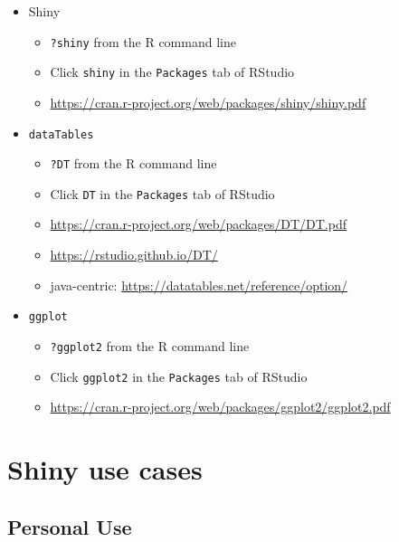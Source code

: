 \documentclass[10pt, letterpaper]{article}
\begin{document}
\begin{spacing}{1.0}
\begin{itemize}
  \item Shiny
    \begin{itemize}
        \item \texttt{?shiny} from the R command line
        \item Click \texttt{shiny} in the \texttt{Packages} tab of RStudio
        \item \url{https://cran.r-project.org/web/packages/shiny/shiny.pdf}
    \end{itemize}

  \item \texttt{dataTables}
    \begin{itemize}
        \item \texttt{?DT} from the R command line
        \item Click \texttt{DT} in the \texttt{Packages} tab of RStudio
        \item \url{https://cran.r-project.org/web/packages/DT/DT.pdf}
        \item \url{https://rstudio.github.io/DT/}
        \item java-centric:  \url{https://datatables.net/reference/option/}
    \end{itemize}

  \item \texttt{ggplot}
    \begin{itemize}
        \item \texttt{?ggplot2} from the R command line
        \item Click \texttt{ggplot2} in the \texttt{Packages} tab of RStudio
        \item \url{https://cran.r-project.org/web/packages/ggplot2/ggplot2.pdf}
    \end{itemize}

\end{itemize}


\section{Shiny use cases}\label{sec:usecases}

\subsection{Personal Use}\label{sec:usecase1}


\end{spacing}
\end{document}
